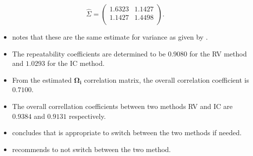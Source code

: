 \documentclass[12pt, a4paper]{report}
\theoremstyle{plain}
\theoremstyle{definition}
\theoremstyle{remark}
\begin{document}
\begin{equation}\hat{\Sigma}=\left(
\begin{array}{cc}
1.6323 & 1.1427 \\
1.1427 & 1.4498 \\
\end{array}
\right).
\end{equation}

\begin{itemize}
\item \citet{ARoy2009} notes that these are the same estimate for variance as given by \citet{BA99}.
	
\item The repeatability coefficients are determined to be $0.9080$ for the RV method and $1.0293$ for the IC method.
	
\item From the estimated $\boldsymbol{\Omega_{i}}$ correlation matrix, the overall correlation coefficient is $0.7100$.

\item The overall correllation coefficients between two methods RV and IC are $0.9384$ and $0.9131$ respectively.
	
\item \citet{ARoy2009} concludes that is appropriate to switch between the two methods if needed.

\item \citet{ARoy2009} recommends to not switch between the two method.
	
	
\end{itemize}
\end{document}
